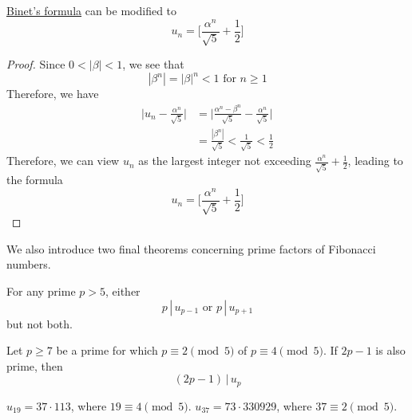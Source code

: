 \documentclass{article}
\newcounter{theorem}[section]
\newcounter{example}[section]
\begin{document}
\begin{corollary}
  \label{thm:rounded-form-of-binets-formula}
\hyperref[thm:binets-formula]{Binet's formula} can be modified to
\begin{equation}
  u_n = \bigg[ \frac{\alpha^n}{\sqrt{5}} + \frac{1}{2} \bigg]
\end{equation}
\end{corollary}
\begin{proof}
Since $0<|\beta|<1$, we see that 
\begin{equation}
  |\beta^n| = |\beta|^n < 1 \text{ for } n \geq 1
\end{equation}
Therefore, we have 
\begin{align*}
    \bigg| u_n - \frac{\alpha^n}{\sqrt{5}} \bigg| & = \bigg| \frac{\alpha^n - \beta^n}{\sqrt{5}} - \frac{\alpha^n}{\sqrt{5}} \bigg| \\
    & = \frac{|\beta^n|}{\sqrt{5}} < \frac{1}{\sqrt{5}} < \frac{1}{2}
\end{align*}
Therefore, we can view $u_n$ as the largest integer not exceeding $\frac{\alpha^n}{\sqrt{5}} + \frac{1}{2}$, leading to the formula 
\begin{equation}
  u_n = \bigg[ \frac{\alpha^n}{\sqrt{5}} + \frac{1}{2} \bigg]
\end{equation}
\end{proof}

We also introduce two final theorems concerning prime factors of Fibonacci numbers. 

\begin{theorem}
  \label{thm:fibonacci-entry-point-of-a-prime}
For any prime $p > 5$, either 
\begin{equation}
  p\,|\,u_{p-1} \text{ or } p \,|\, u_{p+1}
\end{equation}
but not both. 
\end{theorem}

\begin{theorem}
  \label{thm:primes-dividing-up}
Let $p\geq 7$ be a prime for which $p \equiv 2 \pmod{5}$ of $p \equiv 4 \pmod{5}$. If $2p-1$ is also prime, then 
\begin{equation}
  (2p-1)\,\big|\, u_p
\end{equation}
\end{theorem}

\begin{example}
  \label{ex:prime-factorizations-of-u19-and-u37}
$u_{19} = 37 \cdot 113$, where $19 \equiv 4 \pmod{5}$. $u_{37} = 73 \cdot 330929$, where $37 \equiv 2 \pmod{5}$. 
\end{example}
\end{document}
